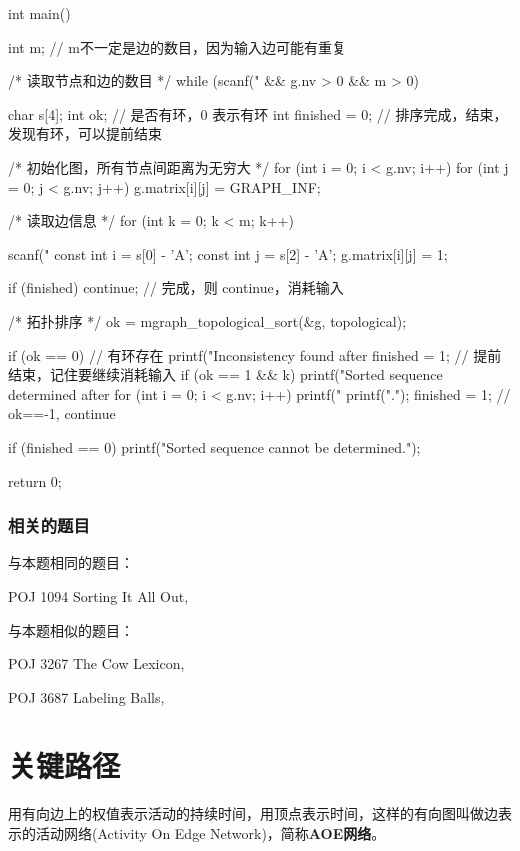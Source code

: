 \begin{Codex}[label=poj_1094.c]
int main() {
    int m;  // m不一定是边的数目，因为输入边可能有重复

    /* 读取节点和边的数目 */
    while (scanf("%
            && g.nv > 0 && m > 0) {
        char s[4];
        int ok;  // 是否有环，0 表示有环
        int finished = 0;  // 排序完成，结束，发现有环，可以提前结束

        /* 初始化图，所有节点间距离为无穷大 */
        for (int i = 0; i < g.nv; i++) {
            for (int j = 0; j < g.nv; j++) {
                g.matrix[i][j] = GRAPH_INF;
            }
        }

        /* 读取边信息 */
        for (int k = 0; k < m; k++) {
            scanf("%
            const int i = s[0] - 'A';
            const int j = s[2] - 'A';
            g.matrix[i][j] = 1;

            if (finished) continue;    // 完成，则 continue，消耗输入

            /* 拓扑排序 */
            ok = mgraph_topological_sort(&g, topological);

            if (ok == 0) {  // 有环存在
                printf("Inconsistency found after %
                finished = 1;  // 提前结束，记住要继续消耗输入
            }
            if (ok == 1 && k) {
                printf("Sorted sequence determined after %
                for (int i = 0; i < g.nv; i++) {
                    printf("%
                }
                printf(".\n");
                finished = 1;
            }
            // ok==-1, continue
        }
        if (finished == 0) {
            printf("Sorted sequence cannot be determined.\n");
        }
    }
    return 0;
}
\end{Codex}

\subsubsection{相关的题目}
与本题相同的题目：
\begindot
\item POJ 1094 Sorting It All Out, 
\myenddot

与本题相似的题目：
\begindot
\item POJ 3267 The Cow Lexicon, 
\item POJ 3687 Labeling Balls, 
\myenddot


\section{关键路径} %
用有向边上的权值表示活动的持续时间，用顶点表示时间，这样的有向图叫做边表示的活动网络(Activity On Edge Network)，简称\textbf{AOE网络}。

